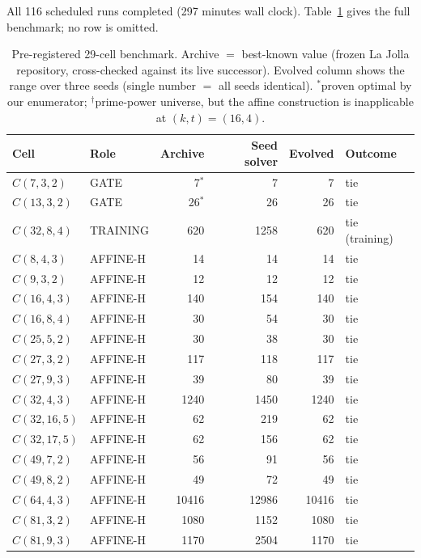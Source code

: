 All 116 scheduled runs completed (297 minutes wall clock).
Table~\ref{tab:benchmark} gives the full benchmark; no row is
omitted.

\begin{table}
\caption{Pre-registered 29-cell benchmark. Archive $=$ best-known
value (frozen La Jolla repository, cross-checked against its live
successor). Evolved column shows the range over three seeds (single
number $=$ all seeds identical). $^{*}$proven optimal by our
enumerator; $^{\dagger}$prime-power universe, but the affine
construction is inapplicable at $(k,t)=(16,4)$.}
\label{tab:benchmark}
\small
\begin{tabular}{llrrrl}
\toprule
Cell & Role & Archive & Seed solver & Evolved & Outcome \\
\midrule
$C(7,3,2)$   & GATE     & 7$^{*}$  & 7     & 7     & tie \\
$C(13,3,2)$  & GATE     & 26$^{*}$ & 26    & 26    & tie \\
$C(32,8,4)$  & TRAINING & 620      & 1258  & 620   & tie (training) \\
$C(8,4,3)$   & AFFINE-H & 14       & 14    & 14    & tie \\
$C(9,3,2)$   & AFFINE-H & 12       & 12    & 12    & tie \\
$C(16,4,3)$  & AFFINE-H & 140      & 154   & 140   & tie \\
$C(16,8,4)$  & AFFINE-H & 30       & 54    & 30    & tie \\
$C(25,5,2)$  & AFFINE-H & 30       & 38    & 30    & tie \\
$C(27,3,2)$  & AFFINE-H & 117      & 118   & 117   & tie \\
$C(27,9,3)$  & AFFINE-H & 39       & 80    & 39    & tie \\
$C(32,4,3)$  & AFFINE-H & 1240     & 1450  & 1240  & tie \\
$C(32,16,5)$ & AFFINE-H & 62       & 219   & 62    & tie \\
$C(32,17,5)$ & AFFINE-H & 62       & 156   & 62    & tie \\
$C(49,7,2)$  & AFFINE-H & 56       & 91    & 56    & tie \\
$C(49,8,2)$  & AFFINE-H & 49       & 72    & 49    & tie \\
$C(64,4,3)$  & AFFINE-H & 10416    & 12986 & 10416 & tie \\
$C(81,3,2)$  & AFFINE-H & 1080     & 1152  & 1080  & tie \\
$C(81,9,3)$  & AFFINE-H & 1170     & 2504  & 1170  & tie \\

\end{tabular}
\end{table}
